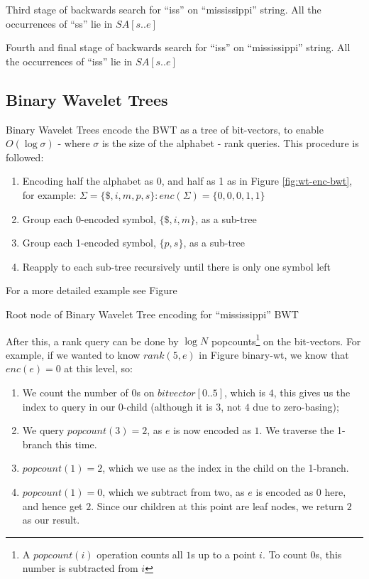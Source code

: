 			{Third stage of backwards search for ``iss'' on ``mississippi'' 
			string. All the occurrences of ``ss'' lie in $SA[s..e]$}

			{Fourth and final stage of backwards search for ``iss'' on
			``mississippi'' string. All the occurrences of ``iss'' lie in
			$SA[s..e]$}
		\newpage


\subsection{Binary Wavelet Trees}
Binary Wavelet Trees encode the BWT as a tree of bit-vectors, to enable
$O(\log \sigma)$ - where $\sigma$ is the size of the alphabet - rank queries. This procedure is followed:

\begin{enumerate}
    \item
		Encoding half the alphabet as 0, and half as 1 as in Figure
    	\ref{fig:wt-enc-bwt}, for example:
    	$\Sigma = \{ \$, i, m, p, s \} : enc(\Sigma) = \{ 0, 0, 0, 1, 1 \}$
    \item
		Group each 0-encoded symbol, $\{ \$, i, m \}$, as a sub-tree
    \item
		Group each 1-encoded symbol, $\{ p, s \}$, as a sub-tree
    \item
		Reapply to each sub-tree recursively until there is only one symbol
    	left
\end{enumerate}

For a more detailed example see Figure %


			{Root node of Binary Wavelet Tree encoding for ``mississippi'' BWT}


After this, a rank query can be done by $\log N$ popcounts\footnote{A
$popcount(i)$ operation counts all $1$s up to a point $i$. To count $0$s, this
number is subtracted from $i$} on the bit-vectors. For example, if we wanted to 
know $rank(5, e)$ in Figure binary-wt, we know that $enc(e) = 0$ at this level, so:

\begin{enumerate}
    \item
		We count the number of $0$s on $bitvector[0..5]$, which is $4$, this
   		gives us the index to query in our 0-child (although it is $3$, not $4$ 
		due to zero-basing);
    \item
		We query $popcount(3) = 2$, as $e$ is now encoded as $1$. We traverse
    	the 1-branch this time.
    \item
		$popcount(1) = 2$, which we use as the index in the child on the
    	1-branch.
    \item
		$popcount(1) = 0$, which we subtract from two, as $e$ is encoded as
    	$0$ here, and hence get $2$. Since our children at this point are leaf
    	nodes, we return $2$ as our result.
\end{enumerate}

